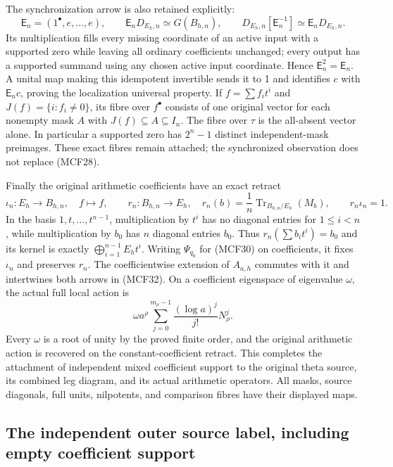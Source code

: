 The synchronization arrow is also retained explicitly:
\[
\mathsf E_n=(1^\bullet,e,\ldots,e),\qquad
\mathsf E_nD_{E_h,n}\simeq G(B_{h,n}),\qquad
D_{E_h,n}[\mathsf E_n^{-1}]\simeq\mathsf E_nD_{E_h,n}.
\tag{MCF31}
\]
Its multiplication fills every missing coordinate of an active input
with a supported zero while leaving all ordinary coefficients unchanged;
every output has a supported summand using any chosen active input
coordinate.  Hence $\mathsf E_n^2=\mathsf E_n$.  A unital map making
this idempotent invertible sends it to 1 and identifies $c$ with
$\mathsf E_nc$, proving the localization universal property.
If $f=\sum f_it^i$ and $J(f)=\{i:f_i\ne0\}$, its fibre over
$f^\bullet$ consists of one original vector for each nonempty mask
$A$ with $J(f)\subseteq A\subseteq I_n$.  The fibre over $\tau$ is
the all-absent vector alone.  In particular a supported zero has
$2^n-1$ distinct independent-mask preimages.  These exact fibres remain
attached; the synchronized observation does not replace (MCF28).

Finally the original arithmetic coefficients have an exact retract
\[
\iota_n:E_h\longrightarrow B_{h,n},\quad f\mapsto f,
\qquad r_n:B_{h,n}\longrightarrow E_h,
\quad r_n(b)=\frac1n\operatorname{Tr}_{B_{h,n}/E_h}(M_b),
\qquad r_n\iota_n=1.
\tag{MCF32}
\]
In the basis $1,t,\ldots,t^{n-1}$, multiplication by $t^i$ has no
diagonal entries for $1\leq i<n$, while multiplication by $b_0$
has $n$ diagonal entries $b_0$.  Thus $r_n(\sum b_it^i)=b_0$ and
its kernel is exactly $\bigoplus_{i=1}^{n-1}E_ht^i$.
Writing $\Psi_{q_0}$ for (MCF30) on coefficients, it fixes $\iota_n$
and preserves $r_n$.  The coefficientwise extension of $A_{a,h}$
commutes with it and intertwines both arrows in (MCF32).  On a coefficient
eigenspace of eigenvalue $\omega$, the actual full local action is
\[
\omega a^\rho\sum_{j=0}^{m_\rho-1}
          \frac{(\log a)^j}{j!}N_\rho^j.
\tag{MCF33}
\]
Every $\omega$ is a root of unity by the proved finite order, and the
original arithmetic action is recovered on the constant-coefficient
retract.  This completes the attachment of independent mixed coefficient
support to the original theta source, its combined leg diagram, and its
actual arithmetic operators.  All masks, source diagonals, full units,
nilpotents, and comparison fibres have their displayed maps.

\subsection{The independent outer source label, including empty coefficient support}

